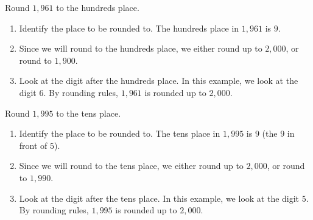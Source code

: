 \begin{myexample}
Round $1,961$ to the hundreds place.
\end{myexample}
\begin{solution}
\begin{enumerate}
\item Identify the place to be rounded to. The hundreds place in $1,961$ is $9$.
\item Since we will round to the hundreds place, we either round up to $2,000$, or round to $1,900$.
\item Look at the digit after the hundreds place. In this example, we look at the digit $6$. By rounding rules, $1,961$ is rounded up to $2,000$.
\end{enumerate}
\end{solution}

\begin{myexample}
Round $1,995$ to the tens place.
\end{myexample}
\begin{solution}
\begin{enumerate}
\item Identify the place to be rounded to. The tens place in $1,995$ is $9$ (the $9$ in front of $5$).
\item Since we will round to the tens place, we either round up to $2,000$, or round to $1,990$.
\item Look at the digit after the tens place. In this example, we look at the digit $5$. By rounding rules, $1,995$ is rounded up to $2,000$.
\end{enumerate}
\end{solution}

